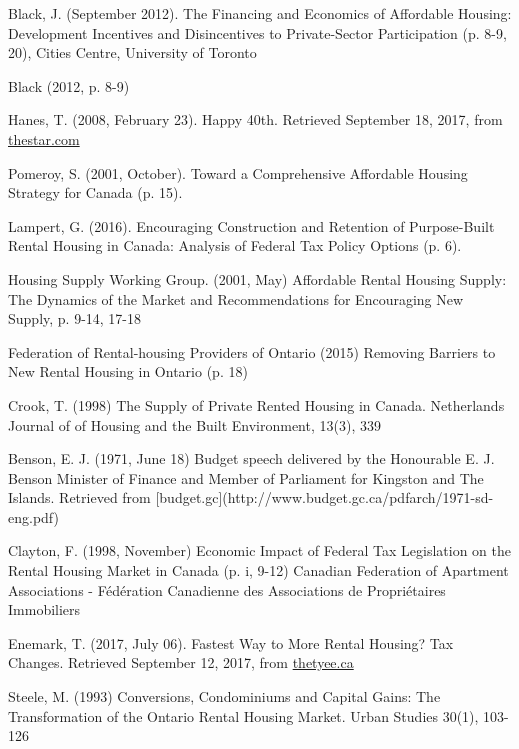 \begin{thebibliography}{9}
 Black, J. (September 2012). The Financing and Economics of Affordable Housing: Development Incentives and Disincentives to Private-Sector Participation (p. 8-9, 20), Cities Centre, University of Toronto

 Black (2012, p. 8-9)

  Hanes, T. (2008, February 23). Happy 40th. Retrieved September 18, 2017, from \href{https://www.thestar.com/news/2008/02/23/happy_40th.html}{thestar.com}

 Pomeroy, S. (2001, October). Toward a Comprehensive Affordable Housing Strategy for Canada (p. 15).

Lampert, G. (2016). Encouraging Construction and Retention of Purpose-Built Rental Housing in Canada: Analysis of Federal Tax Policy Options (p. 6). 

 Housing Supply Working Group. (2001, May) Affordable Rental Housing Supply: The Dynamics of the Market and Recommendations for Encouraging New Supply, p. 9-14, 17-18

 Federation of Rental-housing Providers of Ontario (2015) Removing Barriers to New Rental Housing in Ontario (p. 18)

 Crook, T. (1998) The Supply of Private Rented Housing in Canada. Netherlands Journal of of Housing and the Built Environment, 13(3), 339

 Benson, E. J. (1971, June 18) Budget speech delivered by the Honourable E. J. Benson Minister of Finance and Member of Parliament for Kingston and The Islands. Retrieved from [budget.gc](http://www.budget.gc.ca/pdfarch/1971-sd-eng.pdf)

 Clayton, F. (1998, November) Economic Impact of Federal Tax Legislation on the Rental Housing Market in Canada (p. i, 9-12) Canadian Federation of Apartment Associations - Fédération Canadienne des Associations de Propriétaires Immobiliers

  Enemark, T. (2017, July 06). Fastest Way to More Rental Housing? Tax Changes. Retrieved September 12, 2017, from \href{https://thetyee.ca/Opinion/2017/07/06/Tax-Changes-More-Rental-Housing/}{thetyee.ca}

  Steele, M. (1993) Conversions, Condominiums and Capital Gains: The Transformation of the Ontario Rental Housing Market. Urban Studies 30(1), 103-126


\end{thebibliography}
